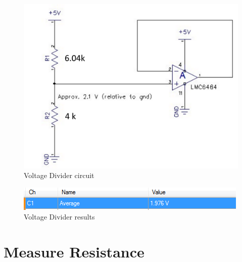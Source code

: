 \documentclass[11pt]{article} %
\begin{document}
\begin{figure}[H]
	\centering
	\includegraphics[width=.8\textwidth]{CD1.png}
	\caption{Voltage Divider circuit}
\end{figure}

\begin{figure}[H]
	\centering
	\includegraphics[width=.5\textwidth]{VoltageDivider.png}
	\caption{Voltage Divider results}
 	\label{fig:awesome}
\end{figure}

\section{Measure Resistance}
\end{document}

